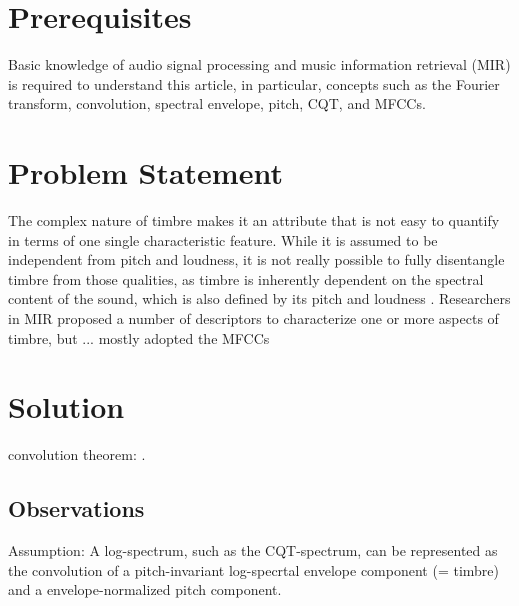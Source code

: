 \documentclass[journal]{IEEEtran}
\begin{document}
\section{Prerequisites}

Basic knowledge of audio signal processing and music information retrieval (MIR) is required to understand this article, in particular, concepts such as the Fourier transform, convolution, spectral envelope, pitch, CQT, and MFCCs.


\section{Problem Statement}

The complex nature of timbre makes it an attribute that is not easy to quantify in terms of one single characteristic feature. While it is assumed to be independent from pitch and loudness, it is not really possible to fully disentangle timbre from those qualities, as timbre is inherently dependent on the spectral content of the sound, which is also defined by its pitch and loudness \cite{moore2004}. Researchers in MIR proposed a number of descriptors to characterize one or more aspects of timbre, but ... mostly adopted the MFCCs




\section{Solution}


convolution theorem: \cite{proakis1995}.

\subsection{Observations}

Assumption: A log-spectrum, such as the CQT-spectrum, can be represented as the convolution of a pitch-invariant log-specrtal envelope component (= timbre) and a envelope-normalized pitch component.
\end{document}
